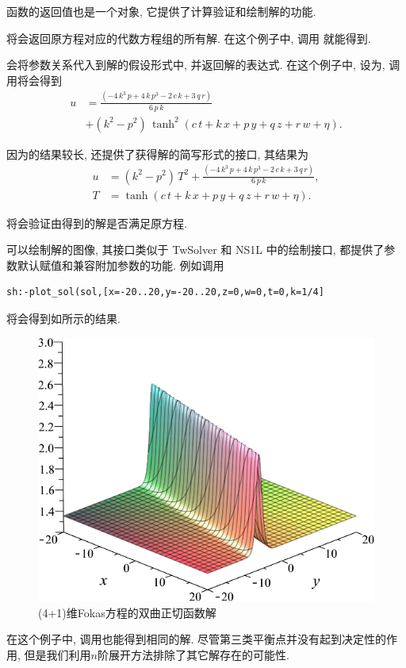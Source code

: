 \begin{example}
函数的返回值也是一个对象, 它提供了计算\D 验证和绘制解的功能. 
\begin{compactitem}[\textbullet]
\item {}将会返回原方程对应的代数方程组的所有解. 在这个例子中, 调用 就能得到.
\item {}会将参数关系代入到解的假设形式中, 并返回解的表达式. 在这个例子中, 设为, 调用将会得到 
\begin{equation}
\begin{aligned}
u&=\frac{\left( -4\,{k}^{3}\,p+4\,k\,{p}^{3}-2\,c\,k+3\,q\,r\right) }{6\,p\,k} \\
&+\left( {k}^{2}-{p}^{2}\right) \,\tanh^2\left( c\,t+k\,x+p\,y+q\,z+r\,w+\eta\right) . 
\label{nctm-long-sol}
\end{aligned}  
\end{equation}
\item 因为的结果较长, 还提供了获得解的简写形式的接口, 其结果为 
\begin{equation}
\begin{aligned}
u&=\left( {k}^{2}-{p}^{2}\right) \,{T}^{2}+\frac{\left( -4\,{k}^{3}\,p+4\,k\,{p}^{3}-2\,c\,k+3\,q\,r\right) }{6\,p\,k}, \\
T&=\tanh\left( c\,t+k\,x+p\,y+q\,z+r\,w+\eta\right) . 
\end{aligned}
\end{equation}
\item {}将会验证由得到的解是否满足原方程.
\item {}可以绘制解的图像, 其接口类似于 TwSolver 和 NS1L 中的绘制接口, 都提供了参数默认赋值和兼容附加参数的功能. 例如调用
\begin{verbatim}
sh:-plot_sol(sol,[x=-20..20,y=-20..20,z=0,w=0,t=0,k=1/4]
\end{verbatim}
将会得到如所示的结果.
\end{compactitem}
\begin{figure}[h]
\centering
\includegraphics[width=.5\textwidth]{fig/(4+1)Fokas-tanh.png}
\caption{(4+1)维Fokas方程的双曲正切函数解} \label{tanh-fokas}
\end{figure}

在这个例子中, 调用也能得到相同的解. 尽管第三类平衡点并没有起到决定性的作用, 但是我们利用$n$阶展开方法排除了其它解存在的可能性.
\end{example}

